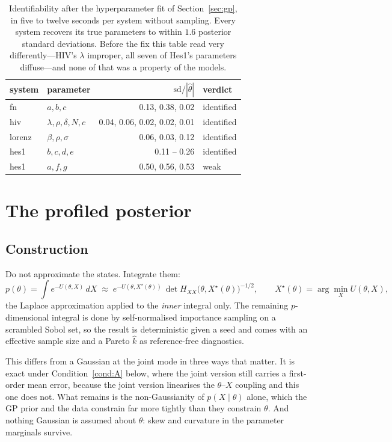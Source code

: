 \documentclass[11pt]{article}
\newcommand{\khat}{\widehat{k}}
\theoremstyle{plain}
\theoremstyle{definition}
\theoremstyle{remark}
\begin{document}
\begin{table}[t]
\centering\small
\begin{tabular}{llrl}
\toprule
system & parameter & $\mathrm{sd}/|\hat\theta|$ & verdict\\
\midrule
fn     & $a, b, c$ & 0.13, 0.38, 0.02 & identified\\
hiv    & $\lambda, \rho, \delta, N, c$ & 0.04, 0.06, 0.02, 0.02, 0.01 & identified\\
lorenz & $\beta, \rho, \sigma$ & 0.06, 0.03, 0.12 & identified\\
hes1   & $b, c, d, e$ & 0.11 -- 0.26 & identified\\
hes1   & $a, f, g$ & 0.50, 0.56, 0.53 & weak\\
\bottomrule
\end{tabular}
\caption{Identifiability after the hyperparameter fit of Section~\ref{sec:gp}, in five to twelve
seconds per system without sampling. Every system recovers its true parameters to within $1.6$
posterior standard deviations. Before the fix this table read very differently---HIV's $\lambda$
improper, all seven of Hes1's parameters diffuse---and none of that was a property of the models.}
\label{tab:diag}
\end{table}

\section{The profiled posterior}
\label{sec:profiled}

\subsection{Construction}

Do not approximate the states. Integrate them:
\begin{equation}
\label{eq:profile}
  p(\theta) = \int e^{-U(\theta,X)}\,dX
  \;\approx\; e^{-U(\theta, X^\star(\theta))}\,
  \det H_{XX}\big(\theta, X^\star(\theta)\big)^{-1/2},
  \qquad X^\star(\theta) = \arg\min_X U(\theta, X),
\end{equation}
the Laplace approximation applied to the \emph{inner} integral only. The remaining
$p$-dimensional integral is done by self-normalised importance sampling on a scrambled Sobol set,
so the result is deterministic given a seed and comes with an effective sample size and a Pareto
$\khat$ as reference-free diagnostics.

This differs from a Gaussian at the joint mode in three ways that matter. It is exact under
Condition~\ref{cond:A} below, where the joint version still carries a first-order mean error,
because the joint version linearises the $\theta$--$X$ coupling and this one does not. What remains
is the non-Gaussianity of $p(X\mid\theta)$ alone, which the GP prior and the data constrain far
more tightly than they constrain $\theta$. And nothing Gaussian is assumed about $\theta$: skew and
curvature in the parameter marginals survive.
\end{document}
